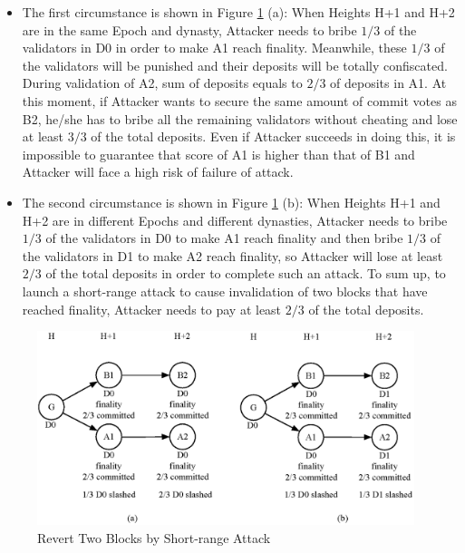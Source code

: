 \begin{itemize}
\item The first circumstance is shown in Figure \ref{fig:revert2} (a): When Heights H+1 and H+2 are in the same Epoch and dynasty, Attacker needs to bribe $1/3$ of the validators in D0 in order to make A1 reach finality. Meanwhile, these $1/3$ of the validators will be punished and their deposits will be totally confiscated. During validation of A2, sum of deposits equals to $2/3$ of deposits in A1. At this moment, if Attacker wants to secure the same amount of commit votes as B2, he/she has to bribe all the remaining validators without cheating and lose at least $3/3$ of the total deposits. Even if Attacker succeeds in doing this, it is impossible to guarantee that score of A1 is higher than that of B1 and Attacker will face a high risk of failure of attack. 

\item The second circumstance is shown in Figure \ref{fig:revert2} (b): When Heights H+1 and H+2 are in different Epochs and different dynasties, Attacker needs to bribe $1/3$ of the validators in D0 to make A1 reach finality and then bribe $1/3$ of the validators in D1 to make A2 reach finality, so Attacker will lose at least $2/3$ of the total deposits in order to complete such an attack. To sum up, to launch a short-range attack to cause invalidation of two blocks that have reached finality, Attacker needs to pay at least $2/3$ of the total deposits. 
\end{itemize}

\begin{figure}[h]
\centering
\includegraphics[width=11cm]{./figs/revert2}
\caption{Revert Two Blocks by Short-range Attack}
\label{fig:revert2}
\end{figure}

